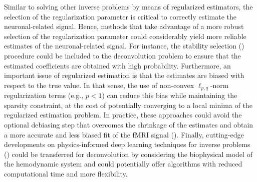 Similar to solving other inverse problems by means of regularized estimators, the selection of the regularization parameter is critical to correctly estimate the neuronal-related signal. Hence, methods that take advantage of a more robust selection of the regularization parameter could considerably yield more reliable estimates of the neuronal-related signal. For instance, the stability selection (\citealt{Meinshausen2010Stabilityselection,Urunuela2020StabilityBasedSparse}) procedure could be included to the deconvolution problem to ensure that the estimated coefficients are obtained with high probability. Furthermore, an important issue of regularized estimation is that the estimates are biased with respect to the true value. In that sense, the use of non-convex \(\ell_{p,q}\)-norm regularization terms (e.g., \(p < 1\)) can reduce this bias while maintaining the sparsity constraint, at the cost of potentially converging to a local minima of the regularized estimation problem. In practice, these approaches could avoid the optional debiasing step that overcomes the shrinkage of the estimates and obtain a more accurate and less biased fit of the fMRI signal (\citealt{Gaudes2013Paradigmfreemapping,CaballeroGaudes2019deconvolutionalgorithmmulti}). Finally, cutting-edge developments on physics-informed deep learning techniques for inverse problems (\citealt{Akcakaya2021,Monga2021,Ongie2020,Cherkaoui_2020}) could be transferred for deconvolution by considering the biophysical model of the hemodynamic system and could potentially offer algorithms with reduced computational time and more flexibility.